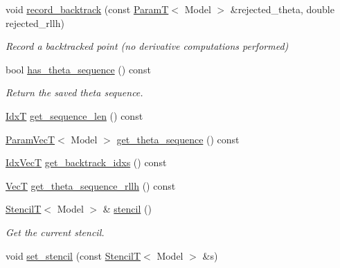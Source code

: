 \begin{DoxyCompactItemize}
void \hyperlink{classmappel_1_1estimator_1_1IterativeMaximizer_1_1MaximizerData_a232d1562d566840dc33127557256f9df}{record\+\_\+backtrack} (const \hyperlink{namespacemappel_a667925cb0d6c0e49f2f035cc5a9a6857}{ParamT}$<$ Model $>$ \&rejected\+\_\+theta, double rejected\+\_\+rllh)
\begin{DoxyCompactList}\small\item\em Record a backtracked point (no derivative computations performed) \end{DoxyCompactList}\item 
bool \hyperlink{classmappel_1_1estimator_1_1IterativeMaximizer_1_1MaximizerData_a3f265c81b27b9e88f2bee94c2e1241d1}{has\+\_\+theta\+\_\+sequence} () const 
\begin{DoxyCompactList}\small\item\em Return the saved theta sequence. \end{DoxyCompactList}\item 
\hyperlink{namespacemappel_ab17ec0f30b61ece292439d7ece81d3a8}{IdxT} \hyperlink{classmappel_1_1estimator_1_1IterativeMaximizer_1_1MaximizerData_af59794b57153a4d3d50bdd26ab33dd18}{get\+\_\+sequence\+\_\+len} () const 
\item 
\hyperlink{namespacemappel_a0f86d3153e4e27b095012f140eea58de}{Param\+VecT}$<$ Model $>$ \hyperlink{classmappel_1_1estimator_1_1IterativeMaximizer_1_1MaximizerData_ad836ac8cee4429b5502fd00f1fcd86d4}{get\+\_\+theta\+\_\+sequence} () const 
\item 
\hyperlink{namespacemappel_ac63743dcd42180127307cd0e4ecdd784}{Idx\+VecT} \hyperlink{classmappel_1_1estimator_1_1IterativeMaximizer_1_1MaximizerData_aab204d1c39753ea46100b3e59fce6efb}{get\+\_\+backtrack\+\_\+idxs} () const 
\item 
\hyperlink{namespacemappel_a2225ad69f358daa3f4f99282a35b9a3a}{VecT} \hyperlink{classmappel_1_1estimator_1_1IterativeMaximizer_1_1MaximizerData_a1bcfa601ad6652916ec426358215ccc5}{get\+\_\+theta\+\_\+sequence\+\_\+rllh} () const 
\item 
\hyperlink{namespacemappel_a3a06598240007876f8c4bf834ad86197}{StencilT}$<$ Model $>$ \& \hyperlink{classmappel_1_1estimator_1_1IterativeMaximizer_1_1MaximizerData_ae6350e11235b8fceca2a1da2ee920db0}{stencil} ()
\begin{DoxyCompactList}\small\item\em Get the current stencil. \end{DoxyCompactList}\item 
void \hyperlink{classmappel_1_1estimator_1_1IterativeMaximizer_1_1MaximizerData_ade4081bcbdad6e43cd886f6bcc3148a3}{set\+\_\+stencil} (const \hyperlink{namespacemappel_a3a06598240007876f8c4bf834ad86197}{StencilT}$<$ Model $>$ \&s)

\end{DoxyCompactItemize}
